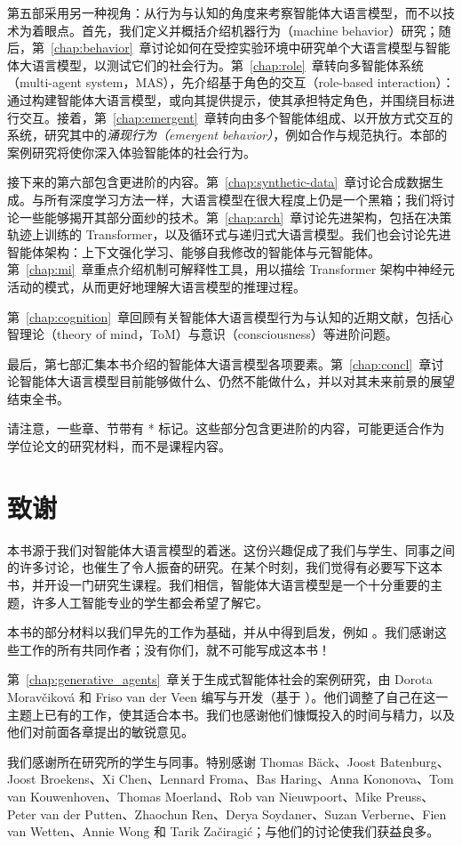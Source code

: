 第五部采用另一种视角：从行为与认知的角度来考察智能体大语言模型，而不以技术为着眼点。首先，我们定义并概括介绍机器行为（machine behavior）研究；随后，第~\ref{chap:behavior}~章讨论如何在受控实验环境中研究单个大语言模型与智能体大语言模型，以测试它们的社会行为。第~\ref{chap:role}~章转向多智能体系统（multi-agent system，MAS），先介绍基于角色的交互（role-based interaction）：通过构建智能体大语言模型，或向其提供提示，使其承担特定角色，并围绕目标进行交互。接着，第~\ref{chap:emergent}~章转向由多个智能体组成、以开放方式交互的系统，研究其中的{\em 涌现行为（emergent behavior）}，例如合作与规范执行。本部的案例研究将使你深入体验智能体的社会行为。

接下来的第六部包含更进阶的内容。第~\ref{chap:synthetic-data}~章讨论合成数据生成。与所有深度学习方法一样，大语言模型在很大程度上仍是一个黑箱；我们将讨论一些能够揭开其部分面纱的技术。第~\ref{chap:arch}~章讨论先进架构，包括在决策轨迹上训练的 Transformer，以及循环式与递归式大语言模型。我们也会讨论先进智能体架构：上下文强化学习、能够自我修改的智能体与元智能体。第~\ref{chap:mi}~章重点介绍机制可解释性工具，用以描绘 Transformer 架构中神经元活动的模式，从而更好地理解大语言模型的推理过程。

第~\ref{chap:cognition}~章回顾有关智能体大语言模型行为与认知的近期文献，包括心智理论（theory of mind，ToM）与意识（consciousness）等进阶问题。

最后，第七部汇集本书介绍的智能体大语言模型各项要素。第~\ref{chap:concl}~章讨论智能体大语言模型目前能够做什么、仍然不能做什么，并以对其未来前景的展望结束全书。

请注意，一些章、节带有 * 标记。这些部分包含更进阶的内容，可能更适合作为学位论文的研究材料，而不是课程内容。

\section{致谢}
本书源于我们对智能体大语言模型的着迷。这份兴趣促成了我们与学生、同事之间的许多讨论，也催生了令人振奋的研究。在某个时刻，我们觉得有必要写下这本书，并开设一门研究生课程。我们相信，智能体大语言模型是一个十分重要的主题，许多人工智能专业的学生都会希望了解它。

本书的部分材料以我们早先的工作为基础，并从中得到启发，例如 \citet{van2023theory,van2024hybrid,huisman2021survey,moerland2023model,plaat2022deep,plaat2024reasoning, plaat2025agentic,van2024llamea,chen2025does,van2025baba,xing2025cocomposer}。我们感谢这些工作的所有共同作者；没有你们，就不可能写成这本书！

第~\ref{chap:generative_agents}~章关于生成式智能体社会的案例研究，由 Dorota Moravčiková 和 Friso van der Veen 编写与开发（基于 \citep{park2023generative}）。他们调整了自己在这一主题上已有的工作，使其适合本书。我们也感谢他们慷慨投入的时间与精力，以及他们对前面各章提出的敏锐意见。

我们感谢所在研究所的学生与同事。特别感谢 Thomas B\"ack、Joost Batenburg、Joost Broekens、Xi Chen、Lennard Froma、Bas Haring、Anna Kononova、Tom van Kouwenhoven、Thomas Moerland、Rob van Nieuwpoort、Mike Preuss、Peter van der Putten、Zhaochun Ren、Derya Soydaner、Suzan Verberne、Fien van Wetten、Annie Wong 和 Tarik Začiragić；与他们的讨论使我们获益良多。



